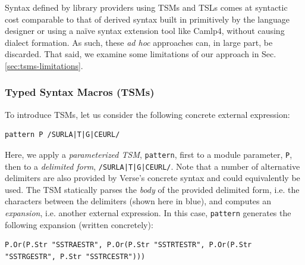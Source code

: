 Syntax defined by library providers using TSMs and TSLs comes at syntactic cost comparable to that of derived syntax built in primitively by the language designer or  using a na\"ive syntax extension tool like Camlp4, without causing dialect formation. As such, these \emph{ad hoc} approaches can, in large part, be discarded. That said, we examine some limitations of our approach in Sec. \ref{sec:tsms-limitations}.

\subsubsection{Typed Syntax Macros (TSMs)}\label{sec:tsms}
To introduce TSMs, let us consider the following concrete external expression:
\begin{lstlisting}[numbers=none]
pattern P /SURLA|T|G|CEURL/
\end{lstlisting}
Here, we apply a \emph{parameterized TSM}, \lstinline{pattern}, first to a module parameter, \lstinline{P}, then to a \emph{delimited form}, \lstinline{/SURLA|T|G|CEURL/}. Note that a number of alternative delimiters are also provided by Verse's concrete syntax and could equivalently be used. The TSM statically parses the \emph{body} of the provided delimited form, i.e. the characters between the delimiters (shown here in blue), and computes an \emph{expansion}, i.e. another external expression. In this case, \lstinline{pattern} generates the following expansion (written concretely):

\begin{lstlisting}[numbers=none]
P.Or(P.Str "SSTRAESTR", P.Or(P.Str "SSTRTESTR", P.Or(P.Str "SSTRGESTR", P.Str "SSTRCESTR")))
\end{lstlisting}

